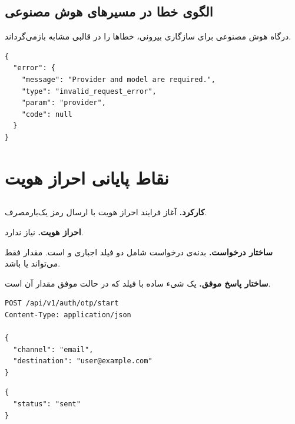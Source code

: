 
\subsection*{الگوی خطا در مسیرهای هوش مصنوعی}
درگاه هوش مصنوعی برای سازگاری بیرونی، خطاها را در قالبی مشابه 
بازمی‌گرداند.

\begin{latin}
\begin{lstlisting}[style=jsonStyle]
{
  "error": {
    "message": "Provider and model are required.",
    "type": "invalid_request_error",
    "param": "provider",
    "code": null
  }
}
\end{lstlisting}
\end{latin}


\section{نقاط پایانی احراز هویت}

\subsection{}
\textbf{کارکرد.} آغاز فرایند احراز هویت با ارسال رمز یک‌بارمصرف.

\textbf{احراز هویت.} نیاز ندارد.

\textbf{ساختار درخواست.} بدنه‌ی درخواست شامل دو فیلد اجباری
 و  است. مقدار  فقط می‌تواند
 یا  باشد.

\textbf{ساختار پاسخ موفق.} یک شیء ساده با فیلد  که در حالت
موفق مقدار آن  است.

\begin{latin}
\begin{lstlisting}[style=jsonStyle]
POST /api/v1/auth/otp/start
Content-Type: application/json

{
  "channel": "email",
  "destination": "user@example.com"
}
\end{lstlisting}
\end{latin}


\begin{latin}
\begin{lstlisting}[style=jsonStyle]
{
  "status": "sent"
}
\end{lstlisting}
\end{latin}

